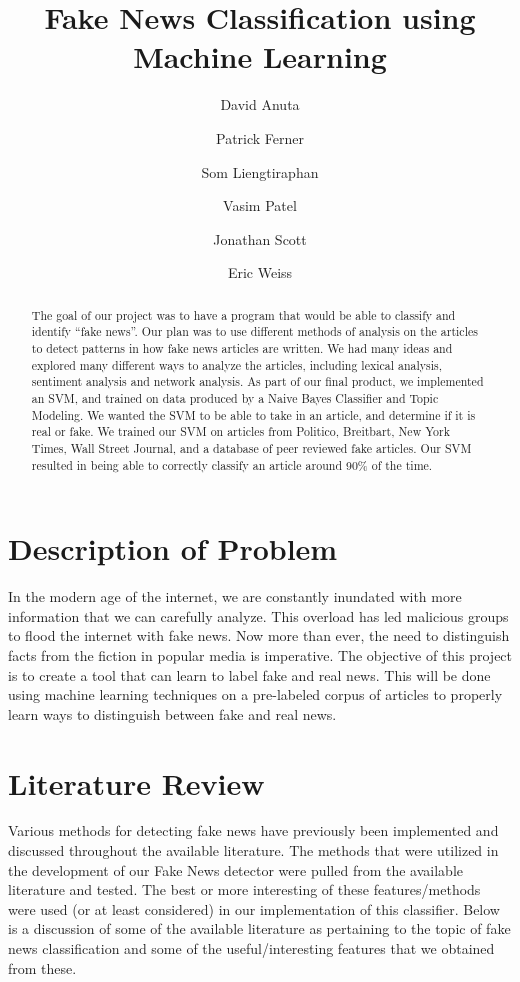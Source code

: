\documentclass{eptcs}
\title{Fake News Classification using Machine Learning} %
\author{
David Anuta
\and
Patrick Ferner
\and
Som Liengtiraphan
\and
Vasim Patel
\and
Jonathan Scott
\and
Eric Weiss
}
\begin{document}
\maketitle
\begin{abstract}
	The goal of our project was to have a program that would be able to classify and identify “fake news”. Our plan was to use different methods of analysis on the articles to detect patterns in how fake news articles are written. We had many ideas and explored many different ways to analyze the articles, including lexical analysis, sentiment analysis and network analysis. As part of our final product, we implemented an SVM, and trained on data produced by a Naive Bayes Classifier and Topic Modeling. We wanted the SVM to be able to take in an article, and determine if it is real or fake. We trained our SVM on articles from Politico, Breitbart, New York Times, Wall Street Journal, and a database of peer reviewed fake articles. Our SVM resulted in being able to correctly classify an article around 90\% of the time.
\end{abstract}
\section*{Description of Problem}
In the modern age of the internet, we are constantly inundated with  more information that we can carefully analyze. This overload has led malicious groups to flood the internet with fake news. Now more than ever, the need to distinguish facts from the fiction in popular media is imperative. The objective of this project is to create a tool that can learn to label fake and real news. This will be done using machine learning techniques on a pre-labeled corpus of articles to properly learn ways to distinguish between fake and real news.
\section*{Literature Review}
Various methods for detecting fake news have previously been implemented and discussed throughout the available literature. The methods that were utilized in the development of our Fake News detector were pulled from the available literature and tested. The best or more interesting of these features/methods were used (or at least considered) in our implementation of this classifier. Below is a discussion of some of the available literature as pertaining to the topic of fake news classification and some of the useful/interesting features that we obtained from these.
\end{document}
